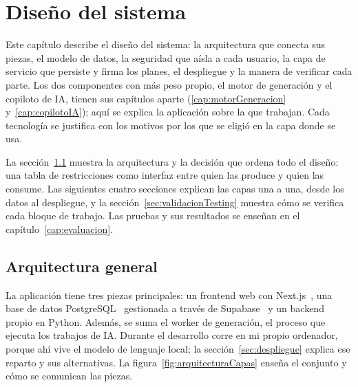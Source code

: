 \chapter{Diseño del sistema}
\label{cap:disenoSistema}

Este capítulo describe el diseño del sistema: la arquitectura que conecta sus piezas, el modelo de datos, la seguridad que aísla a cada usuario, la capa de servicio que persiste y firma los planes, el despliegue y la manera de verificar cada parte. Los dos componentes con más peso propio, el motor de generación y el copiloto de IA, tienen sus capítulos aparte (\ref{cap:motorGeneracion} y~\ref{cap:copilotoIA}); aquí se explica la aplicación sobre la que trabajan. Cada tecnología se justifica con los motivos por los que se eligió en la capa donde se usa.

La sección~\ref{sec:arquitecturaGeneral} muestra la arquitectura y la decisión que ordena todo el diseño: una tabla de restricciones como interfaz entre quien las produce y quien las consume. Las siguientes cuatro secciones explican las capas una a una, desde los datos al despliegue, y la sección~\ref{sec:validacionTesting} muestra cómo se verifica cada bloque de trabajo. Las pruebas y sus resultados se enseñan en el capítulo~\ref{cap:evaluacion}.

\section{Arquitectura general}
\label{sec:arquitecturaGeneral}

La aplicación tiene tres piezas principales: un frontend web con Next.js~\citep{nextjs}, una base de datos PostgreSQL~\citep{postgresql} gestionada a través de Supabase~\citep{supabase} y un backend propio en Python. Además, se suma el worker de generación, el proceso que ejecuta los trabajos de IA. Durante el desarrollo corre en mi propio ordenador, porque ahí vive el modelo de lenguaje local; la sección~\ref{sec:despliegue} explica ese reparto y sus alternativas. La figura~\ref{fig:arquitecturaCapas} enseña el conjunto y cómo se comunican las piezas.

